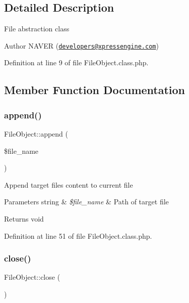 \subsection{Detailed Description}
File abstraction class

\begin{DoxyAuthor}{Author}
N\+A\+V\+ER (\href{mailto:developers@xpressengine.com}{\tt developers@xpressengine.\+com}) 
\end{DoxyAuthor}


Definition at line 9 of file File\+Object.\+class.\+php.



\subsection{Member Function Documentation}
\hypertarget{classFileObject_add062e05a5efc8c4c5947cbf3ff120a7}{}\label{classFileObject_add062e05a5efc8c4c5947cbf3ff120a7} 
\subsubsection{\texorpdfstring{append()}{append()}}
{\footnotesize\ttfamily File\+Object\+::append (\begin{DoxyParamCaption}\item[{}]{\$file\+\_\+name }\end{DoxyParamCaption})}

Append target file\textquotesingle{}s content to current file


\begin{DoxyParams}[1]{Parameters}
string & {\em \$file\+\_\+name} & Path of target file \\
\hline
\end{DoxyParams}
\begin{DoxyReturn}{Returns}
void 
\end{DoxyReturn}


Definition at line 51 of file File\+Object.\+class.\+php.

\hypertarget{classFileObject_a14dcc624814271fb3f91a2a20a23ab24}{}\label{classFileObject_a14dcc624814271fb3f91a2a20a23ab24} 
\subsubsection{\texorpdfstring{close()}{close()}}
{\footnotesize\ttfamily File\+Object\+::close (\begin{DoxyParamCaption}{ }\end{DoxyParamCaption})}

